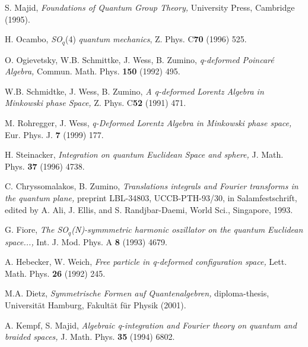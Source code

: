 \documentclass[a4paper,11pt,oneside]{article}
\begin{document}
\begin{thebibliography}{99}
  S. Majid, \textit{Foundations of Quantum Group Theory, }%
University Press, Cambridge (1995).

  H. Ocambo, \textit{SO}$_{q}$(4) \textit{quantum mechanics},
Z. Phys. C\textbf{70} (1996) 525.

  O. Ogievetsky, W.B. Schmittke, J. Wess, B. Zumino, \textit{%
q-deformed Poincar\'{e} Algebra,} Commun. Math. Phys. \textbf{150} (1992) 495.

  W.B. Schmidtke, J. Wess, B. Zumino, \textit{A q-deformed
Lorentz Algebra in Minkowski phase Space, }Z. Phys.  C\textbf{52 }(1991) 471.

  M. Rohregger, J. Wess, \textit{q-Deformed Lorentz Algebra in
Minkowski phase space, }Eur. Phys. J. \textbf{7} (1999) 177.

  H. Steinacker, \textit{Integration on quantum Euclidean
Space and sphere,} J. Math. Phys. \textbf{37} (1996) 4738.

  C. Chryssomalakos, B. Zumino, \textit{Translations integrals
and Fourier transforms in the quantum plane, }preprint LBL-34803,
UCCB-PTH-93/30, in Salamfestschrift, edited by A. Ali, J. Ellis, and S.
Randjbar-Daemi, World Sci., Singapore, 1993.

  G. Fiore, \textit{The SO}$_{q}$\textit{(N)-symmmetric
harmonic oszillator on the quantum Euclidean space...,} Int. J. Mod. Phys. A%
\textbf{8} (1993) 4679.

  A. Hebecker, W. Weich, \textit{Free particle in q-deformed
configuration space, }Lett. Math. Phys. \textbf{26} (1992) 245.

  M.A. Dietz, \textit{Symmetrische Formen auf
Quantenalgebren, }diploma-thesis, Universit\"{a}t Hamburg, Fakult\"{a}t
f\"{u}r Physik (2001).

  A. Kempf, S. Majid, \textit{Algebraic q-integration and
Fourier theory on quantum and braided spaces, }J. Math. Phys. \textbf{35}
(1994) 6802.
\end{thebibliography}
\end{document}
